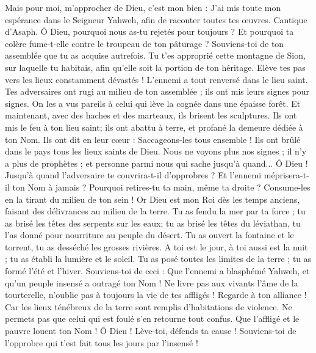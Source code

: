 \begin{multicols}{2}
Mais pour moi, m'approcher de Dieu, c'est mon bien : J'ai mis toute mon espérance dans le Seigneur Yahweh, afin de raconter toutes tes œuvres.
\VerseOne{}Cantique d'Asaph. Ô Dieu, pourquoi nous as-tu rejetés pour toujours ? Et pourquoi ta colère fume-t-elle contre le troupeau de ton pâturage ?
Souviens-toi de ton assemblée que tu as acquise autrefois. Tu t'es approprié cette montagne de Sion, sur laquelle tu habitais, afin qu'elle soit la portion de ton héritage.
Elève tes pas vers les lieux constamment dévastés ! L'ennemi a tout renversé dans le lieu saint.
Tes adversaires ont rugi au milieu de ton assemblée ; ils ont mis leurs signes pour signes.
On les a vus pareils à celui qui lève la cognée dans une épaisse forêt.
Et maintenant, avec des haches et des marteaux, ils brisent les sculptures.
Ils ont mis le feu à ton lieu saint; ils ont abattu à terre, et profané la demeure dédiée à ton Nom.
Ils ont dit en leur cœur : Saccageons-les tous ensemble ! Ils ont brûlé dans le pays tous les lieux saints de Dieu.
Nous ne voyons plus nos signes ; il n'y a plus de prophètes ; et personne parmi nous qui sache jusqu'à quand...
Ô Dieu ! Jusqu'à quand l'adversaire te couvrira-t-il d'opprobres ? Et l'ennemi méprisera-t-il ton Nom à jamais ?
Pourquoi retires-tu ta main, même ta droite ? Consume-les en la tirant du milieu de ton sein !
Or Dieu est mon Roi dès les temps anciens, faisant des délivrances au milieu de la terre.
Tu as fendu la mer par ta force ; tu as brisé les têtes des serpents sur les eaux;
tu as brisé les têtes du léviathan, tu l'as donné pour nourriture au peuple du désert.
Tu as ouvert la fontaine et le torrent, tu as desséché les grosses rivières.
A toi est le jour, à toi aussi est la nuit ; tu as établi la lumière et le soleil.
Tu as posé toutes les limites de la terre ; tu as formé l'été et l'hiver.
Souviens-toi de ceci : Que l'ennemi a blasphémé Yahweh, et qu'un peuple insensé a outragé ton Nom !
Ne livre pas aux vivants l'âme de la tourterelle, n'oublie pas à toujours la vie de tes affligés !
Regarde à ton alliance ! Car les lieux ténébreux de la terre sont remplis d'habitations de violence.
Ne permets pas que celui qui est foulé s'en retourne tout confus. Que l'affligé et le pauvre louent ton Nom !
Ô Dieu ! Lève-toi, défends ta cause ! Souviens-toi de l'opprobre qui t'est fait tous les jours par l'insensé !

\end{multicols}
